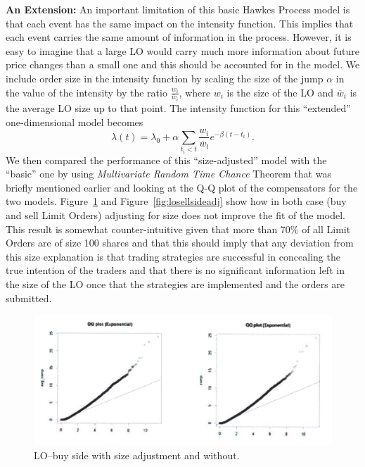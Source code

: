 \noindent\textbf{An Extension:} An important limitation of this basic Hawkes Process model is that each event has the same impact on the intensity function. This implies that each event carries the same amount of information in the process. However, it is easy to imagine that a large LO would carry much more information about future price changes than a small one and this should be accounted for in the model. We include order size in the intensity function by scaling the size of the jump $\alpha$ in the value of the intensity by the ratio $\frac{w_i}{\overline{w}_i}$, where $w_i$ is the size of the LO and $\overline{w}_i$ is the average LO size up to that point. The intensity function for this ``extended'' one-dimensional model becomes
	\begin{equation} \label{eqn:lambdateq}
	\lambda(t)= \lambda_0 + \alpha \sum_{t_i<t} \dfrac{w_i}{\overline{w}_l} e^{-\beta(t-t_i)}.
	\end{equation}
We then compared the performance of this ``size-adjusted'' model with the ``basic'' one by using \emph{Multivariate Random Time Chance} Theorem that was briefly mentioned earlier and looking at the Q-Q plot of the compensators for the two models. Figure~\ref{fig:lobuysideadj} and Figure~\ref{fig:losellsideadj} show how in both case (buy and sell Limit Orders) adjusting for size does not improve the fit of the model. This result is somewhat counter-intuitive given that more than 70\% of all Limit Orders are of size 100 shares and that this should imply that any deviation from this size explanation is that trading strategies are successful in concealing the true intention of the traders and that there is no significant information left in the size of the LO once that the strategies are implemented and the orders are submitted. 
	\begin{figure}[!ht]
   	\centering
   	\includegraphics[width=\textwidth]{chapters/chapter_trade_data_models/figures/lobuysideadj.png} 
   	\caption{LO--buy side with size adjustment and without.\label{fig:lobuysideadj}}
	\end{figure}
